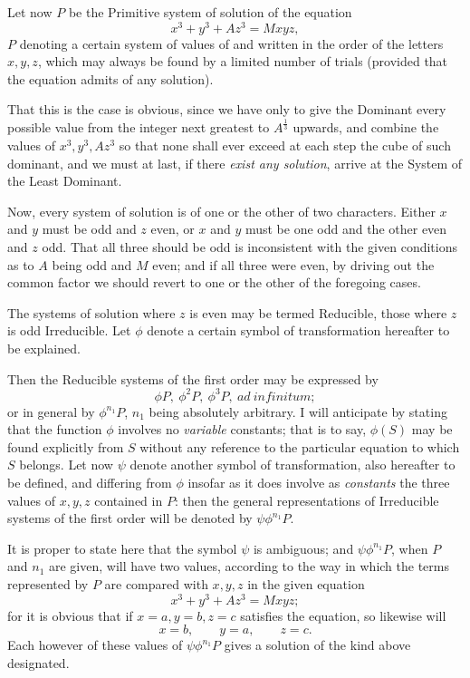 \documentclass[11pt]{article}
\newcommand{\sourcepage}[1]{\marginpar{\scriptsize p.~#1}}
\begin{document}
Let now $P$ be the Primitive system of solution of the equation
\[
x^3+y^3+Az^3=Mxyz,
\]
$P$ denoting a certain system of values of and written in the order of the letters $x,y,z$, which may always be found by a limited number of trials (provided that the equation admits of any solution).

\sourcepage{115}
That this is the case is obvious, since we have only to give the Dominant every possible value from the integer next greatest to $A^{\frac{1}{3}}$ upwards, and combine the values of $x^3,y^3,Az^3$ so that none shall ever exceed at each step the cube of such dominant, and we must at last, if there \emph{exist any solution}, arrive at the System of the Least Dominant.

Now, every system of solution is of one or the other of two characters. Either $x$ and $y$ must be odd and $z$ even, or $x$ and $y$ must be one odd and the other even and $z$ odd. That all three should be odd is inconsistent with the given conditions as to $A$ being odd and $M$ even; and if all three were even, by driving out the common factor we should revert to one or the other of the foregoing cases.

The systems of solution where $z$ is even may be termed Reducible, those where $z$ is odd Irreducible. Let $\phi$ denote a certain symbol of transformation hereafter to be explained.

Then the Reducible systems of the first order may be expressed by
\[
\phi P,\ \phi^2P,\ \phi^3P,\ ad\ infinitum;
\]
or in general by $\phi^{n_1}P$, $n_1$ being absolutely arbitrary. I will anticipate by stating that the function $\phi$ involves no \emph{variable} constants; that is to say, $\phi(S)$ may be found explicitly from $S$ without any reference to the particular equation to which $S$ belongs. Let now $\psi$ denote another symbol of transformation, also hereafter to be defined, and differing from $\phi$ insofar as it does involve as \emph{constants} the three values of $x,y,z$ contained in $P$: then the general representations of Irreducible systems of the first order will be denoted by $\psi\phi^{n_1}P$.

It is proper to state here that the symbol $\psi$ is ambiguous; and $\psi\phi^{n_1}P$, when $P$ and $n_1$ are given, will have two values, according to the way in which the terms represented by $P$ are compared with $x,y,z$ in the given equation
\[
x^3+y^3+Az^3=Mxyz;
\]
for it is obvious that if $x=a,y=b,z=c$ satisfies the equation, so likewise will
\[
x=b,\qquad y=a,\qquad z=c.
\]
Each however of these values of $\psi\phi^{n_1}P$ gives a solution of the kind above designated.
\end{document}
